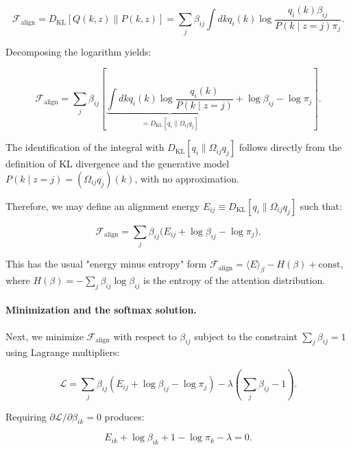 \documentclass[11pt]{article}
\begin{document}
\begin{equation}
\mathcal{F}_{\text{align}} = D_{\mathrm{KL}}[Q(k,z) \| P(k,z)] = \sum_j \beta_{ij} \int dk q_i(k) \log \frac{q_i(k) \beta_{ij}}{P(k \mid z{=}j) \pi_j}.
\end{equation}

Decomposing the logarithm yields:

\begin{equation}
\mathcal{F}_{\text{align}} = \sum_j \beta_{ij} \left[ \underbrace{\int dk q_i(k) \log \frac{q_i(k)}{P(k \mid z{=}j)}}_{=  D_{\mathrm{KL}}[q_i \| \Omega_{ij} q_j]} + \log \beta_{ij} - \log \pi_j \right].
\label{eq:mixture_free_energy}
\end{equation}

The identification of the integral with $D_{\mathrm{KL}}[q_i \| \Omega_{ij} q_j]$ follows directly from the definition of KL divergence and the generative model $P(k \mid z{=}j) = (\Omega_{ij} q_j)(k)$, with no approximation.

Therefore, we may define an alignment energy $E_{ij} \equiv D_{\mathrm{KL}}[q_i \| \Omega_{ij} q_j]$ such that:

\begin{equation}
\mathcal{F}_{\text{align}} = \sum_j \beta_{ij} \big( E_{ij} + \log \beta_{ij} - \log \pi_j \big).
\label{eq:mixture_energy_entropy}
\end{equation}

This has the usual "energy minus entropy" form $\mathcal{F}_{\text{align}} = \langle E \rangle_\beta - H(\beta) + \text{const}$, where $H(\beta) = -\sum_j \beta_{ij} \log \beta_{ij}$ is the entropy of the attention distribution.

\paragraph{Minimization and the softmax solution.}
Next, we minimize $\mathcal{F}_{\text{align}}$ with respect to $\beta_{ij}$ subject to the constraint $\sum_j \beta_{ij} = 1$ using Lagrange multipliers:

\begin{equation}
\mathcal{L} = \sum_j \beta_{ij}(E_{ij} + \log \beta_{ij} - \log \pi_j) - \lambda\left(\sum_j \beta_{ij} - 1\right).
\end{equation}

Requiring $\partial \mathcal{L} / \partial \beta_{ik} = 0$ produces:

\begin{equation}
E_{ik} + \log \beta_{ik} + 1 - \log \pi_k - \lambda = 0.
\end{equation}
\end{document}
